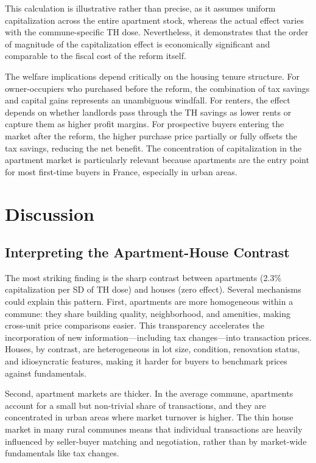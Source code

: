\documentclass[12pt]{article}
\begin{document}
This calculation is illustrative rather than precise, as it assumes uniform capitalization across the entire apartment stock, whereas the actual effect varies with the commune-specific TH dose. Nevertheless, it demonstrates that the order of magnitude of the capitalization effect is economically significant and comparable to the fiscal cost of the reform itself.

The welfare implications depend critically on the housing tenure structure. For owner-occupiers who purchased before the reform, the combination of tax savings and capital gains represents an unambiguous windfall. For renters, the effect depends on whether landlords pass through the TH savings as lower rents or capture them as higher profit margins. For prospective buyers entering the market after the reform, the higher purchase price partially or fully offsets the tax savings, reducing the net benefit. The concentration of capitalization in the apartment market is particularly relevant because apartments are the entry point for most first-time buyers in France, especially in urban areas.


\section{Discussion}

\subsection{Interpreting the Apartment-House Contrast}

The most striking finding is the sharp contrast between apartments (2.3\% capitalization per SD of TH dose) and houses (zero effect). Several mechanisms could explain this pattern. First, apartments are more homogeneous within a commune: they share building quality, neighborhood, and amenities, making cross-unit price comparisons easier. This transparency accelerates the incorporation of new information---including tax changes---into transaction prices. Houses, by contrast, are heterogeneous in lot size, condition, renovation status, and idiosyncratic features, making it harder for buyers to benchmark prices against fundamentals.

Second, apartment markets are thicker. In the average commune, apartments account for a small but non-trivial share of transactions, and they are concentrated in urban areas where market turnover is higher. The thin house market in many rural communes means that individual transactions are heavily influenced by seller-buyer matching and negotiation, rather than by market-wide fundamentals like tax changes.
\end{document}

